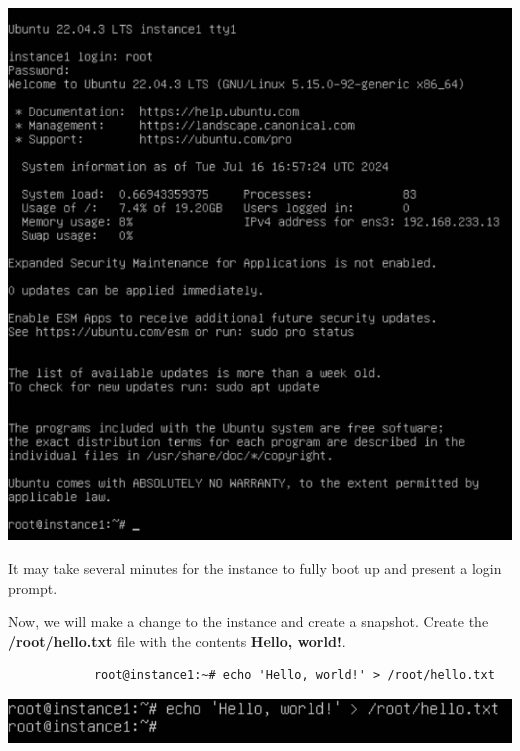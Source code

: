 \documentclass[letterpaper, 12pt]{article}
\begin{document}
\begin{enumerate}
\begin{labstep}
        \begin{center}
            \includegraphics[width=\linewidth]{images/part1/step10.png}
        \end{center}
    \end{labstep}

    \begin{notebox}
        It may take several minutes for the instance to fully boot up and present a login prompt.
    \end{notebox}

    \begin{labstep}
        Now, we will make a change to the instance and create a snapshot.
        Create the \textbf{/root/hello.txt} file with the contents \textbf{Hello, world!}.
        \begin{lstlisting}
            root@instance1:~# echo 'Hello, world!' > /root/hello.txt
        \end{lstlisting}

        \begin{center}
            \includegraphics[width=\linewidth]{images/part1/step11.png}
        \end{center}
    \end{labstep}


\end{enumerate}
\end{document}
